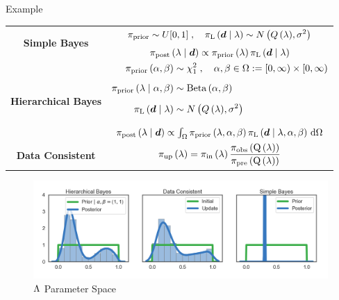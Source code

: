 \begin{block}{Example}
\begin{tabular}{c|c}
\hline
\multirow{2}{*}{\vspace{1.5ex}\textbf{Simple Bayes}} & 
$\begin{aligned}\prior \sim U[0,1]\; , \quad  \likelihood\qGivelam\sim N\left(Q\lam,\sigma^2\right) \end{aligned}$ \\[1.25ex]
                                        & $\bayes$ \\
\hline
\multirow{2}{*}{\vspace{2ex} \textbf{Hierarchical Bayes}}   & $\begin{aligned}
        \prior\hyper &\sim \chi^2_1\; , \quad \alpha,\beta\in\Omega:=[0,\infty)\times[0,\infty) \\[1.25ex]
        \prior\lamGiveH &\sim \text{Beta}\hyper \\[1.25ex]
        \likelihood\qGivelam &\sim N\left(Q\lam,\sigma^2\right)\\[1.25ex] \end{aligned}$ \\[1.25ex]
                                    & $\Hbayes$ \\
\hline
\textbf{Data Consistent} &  $\dci$ \\
\hline
\end{tabular}
\vspace{1cm}
\vspace{-1cm}
\begin{figure}
        \includegraphics[width=32cm]{figures/distr_EX_lambda_space.png}
        \vspace{-2.05cm}
        \centering
        \caption{ $\pspace$ Parameter Space }
\end{figure}
\vspace{-1.5cm}

\end{block}
